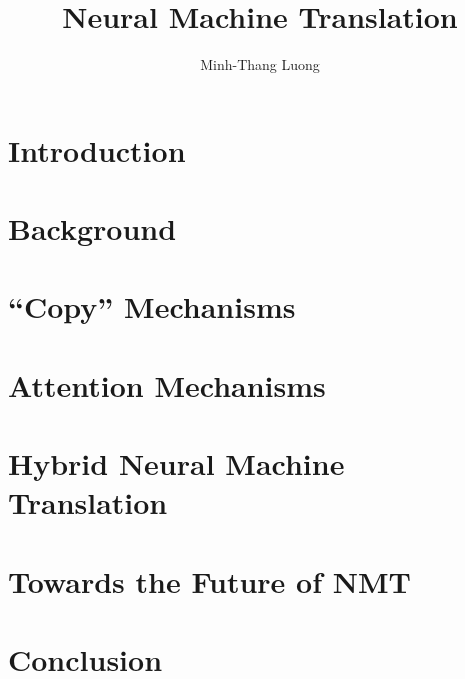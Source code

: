\documentclass[12pt]{report}
\begin{document}
\title{Neural Machine Translation}
\author{Minh-Thang Luong}

\beforepreface
%
%
\afterpreface


\chapter{Introduction}
\label{c:intro}


\chapter{Background}
\label{c:background}


\chapter{``Copy'' Mechanisms}
\label{c:copy}


\chapter{Attention Mechanisms}
\label{c:attention}


\chapter{Hybrid Neural Machine Translation}
\label{c:hybrid}


\chapter{Towards the Future of NMT}
\label{c:future}


\chapter{Conclusion}
\label{c:conclude}



\appendix




\end{document}
